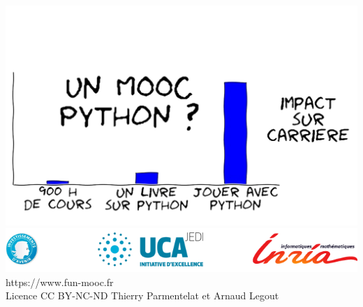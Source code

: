 \documentclass[11pt, a4paper, french
]{book}
\makeatletter
\def\maxwidth{\ifdim\Gin@nat@width>\linewidth\linewidth
    \else\Gin@nat@width\fi}
\let\Oldincludegraphics\includegraphics
\renewcommand{\includegraphics}[1]{\Oldincludegraphics[width=.8\maxwidth]{#1}}
\makeatother
\begin{document}
\begin{titlepage}
\includegraphics{medias/mooc2.png}\\
\vskip100pt
\includegraphics{medias/mooc.png}\\
\large https://www.fun-mooc.fr\\[0.5cm] %
\large Licence CC BY-NC-ND Thierry Parmentelat et Arnaud Legout\\[0.5cm] %




 

\vfill %

\end{titlepage}
\end{document}
